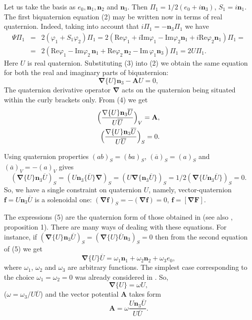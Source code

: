 \documentclass[12pt,a4paper]{article}
\begin{document}
Let us take the basis as
$e_0, \mathbf{n}_1, \mathbf{n}_2$ and $\mathbf{n}_3$.
Then $\Pi_{1}=1/2(e_0+i\mathbf{n}_3)$,
$S_1=i\mathbf{n}_1$.
The first biquaternion equation (2) may be written now in terms of real quaternion.
Indeed, taking into account that  $i\Pi_1=-\mathbf{n}_3\Pi_1$ we have
\begin{eqnarray}
\Psi \Pi_1 & = & 2(\varphi_1+S_1\varphi_2)\Pi_1=2(\mathrm{Re}\varphi_1+i\mathrm{Im}\varphi_1-
\mathrm{Im}\varphi_2\mathbf{n}_1+i\mathrm{Re}\varphi_2\mathbf{n}_1)\Pi_1=
\nonumber \\
& =& 2(\mathrm{Re}\varphi_1-\mathrm{Im}\varphi_2\,  \mathbf{n}_1 +
\mathrm{Re}\varphi_2\, \mathbf{n}_2-\mathrm{Im}\, \varphi_1 \mathbf{n}_3)\Pi_{1}=2U\Pi_1.
\end{eqnarray}
Here $U$ is real quaternion.
Substituting  (3) into (2) we obtain the same equation for both the real and imaginary
parts of biquaternion:
\begin{equation}
\mathbf{\nabla}\{U\}\mathbf{n}_3-\mathbf{A}U=0,
\end{equation}
The quaternion derivative operator $\mathbf{\nabla}$ acts on the quaternion
being situated within the curly brackets only. From (4) we get
\begin{eqnarray}
\Bigl(\frac{\mathbf{\nabla}\{U\}\mathbf{n}_3\overline{U}}{U\overline{U}}\Bigr)_V=
\mathbf{A},  \nonumber \\
\Bigl(\frac{\mathbf{\nabla}\{U\}\mathbf{n}_3\overline{U}}{U\overline{U}}\Bigr)_S=0.
\end{eqnarray}

Using quaternion properties $(ab)_S=(ba)_S$, $(\overline{a})_S=(a)_S$ and
$(\overline{a})_V=-(a)_V$ gives
\begin{displaymath}
(\mathbf{\nabla}\{U\}\mathbf{n}_3\overline{U})_S=
(U\mathbf{n}_3\{\overline{U}\}\mathbf{\nabla})_S=
(U\mathbf{\nabla}\{\mathbf{n}_3\overline{U}\})_S=
1/2(\mathbf{\nabla}\{U\mathbf{n}_3\overline{U}\})_S=0.
\end{displaymath}
So, we have a single constraint on quaternion $U$, namely, vector-quaternion
$\mathbf{f}=U\mathbf{n}_3\overline{U}$ is a solenoidal one:
$(\mathbf{\nabla}\mathbf{f})_S=-(\mathbf{\nabla}\mathbf{f})=0$,
$\mathbf{f}=[\mathbf{\nabla}\mathbf{F}]$.

The expressions (5) are the quaternion form of those obtained in \cite{Loss}
(see also \cite{Elton}, proposition 1). There are many ways of dealing with these
equations. For instance, if
$(\mathbf{\nabla}\{U\}\mathbf{n}_3\overline{U})_S=
(\mathbf{\nabla}\{U\}\overline{U}\mathbf{n}_3)_S=0$ then from the second equation of (5)
we get
\begin{equation}
\mathbf{\nabla}\{U\}\overline{U}=\omega_1\mathbf{n}_1+\omega_2\mathbf{n}_2+\omega_3e_0,
\end{equation}
where $\omega_1$, $\omega_2$ and $\omega_3$ are arbitrary functions.
The simplest case corresponding to the choice $\omega_1=\omega_2=0$ was already
considered in \cite{Loss}. So,
\begin{equation}
\mathbf{\nabla}\{U\}=\omega U,
\end{equation}
($\omega=\omega_3/U\overline{U}$)
and the vector potential $\mathbf{A}$ takes form
$$\mathbf{A}=\omega
\frac{U\mathbf{n}_3\overline{U}}{U\overline{U}}.$$
\end{document}
